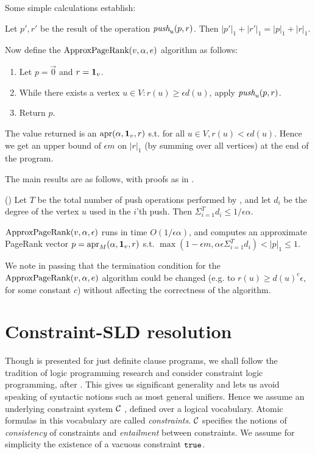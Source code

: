 \documentclass{article} %
\begin{document}
Some simple calculations establish:
\begin{lemma}\label{Lemma:ProbMassConserve}
  Let $p',r'$ be the result of the operation $\mbox{\em push}_u(p,r)$. Then $|p'|_1 + |r'|_1 = |p|_1 + |r|_1$. 
\end{lemma}

Now define the $\mbox{ApproxPageRank}(v,\alpha,e)$ algorithm as follows:
\begin{enumerate}
\item Let $p=\vec{0}$ and $r={\bf 1}_v$.
\item While there exists a vertex $u\in V: r(u) \geq \epsilon d(u)$, apply $\mbox{\em push}_u(p,r)$.
\item Return $p$.
\end{enumerate}
The value returned is an $\mbox{apr}(\alpha,{\bf 1}_v, r)$ s.t. for all $u \in V, r(u)< \epsilon d(u)$. Hence we get an upper bound of $\epsilon m$ on $|r|_1$ (by summing over all vertices) at the end of the program.

The main results are as follows, with proofs as in \cite[Appendix]{Andersen-2006}.

\begin{lemma}(\cite[Lemma 2]{Andersen-2006}) Let $T$ be the total number of push operations performed by \APR, and let $d_i$ be the degree of the vertex $u$ used in the $i$'th push. Then $\Sigma_{i=1}^T d_i \leq 1/\epsilon \alpha$.
\end{lemma}

\begin{theorem}\label{theorem:main}
  $\mbox{ApproxPageRank}(v,\alpha,\epsilon)$ runs in time $O(1/\epsilon \alpha)$, and computes an approximate PageRank vector $p=\mbox{apr}_M(\alpha, {\bf 1}_v,r)$ s.t. $\max(1 - \epsilon m, \alpha \epsilon \Sigma_{i=1}^T d_i) < |p|_1 \leq 1 $.
\end{theorem}

We note in passing that the termination condition for the $\mbox{ApproxPageRank}(v,\alpha,e)$ algorithm could be changed (e.g.{} to $r(u) \geq d(u)^c\epsilon$, for some constant $c$) without affecting the correctness of the algorithm. 



\section{Constraint-SLD resolution}\label{sec:SLD}
Though \cite{Cohen-2015} is presented for just definite clause programs, we shall follow the tradition of logic programming research and consider constraint logic programming, after \cite{Jaffar-1987}. This gives us significant generality and lets us avoid speaking of syntactic notions such as most general unifiers. Hence we assume an underlying constraint system $\cal C$ \cite{Saraswat-1992}, defined over a logical vocabulary. Atomic formulas in this vocabulary are called {\em constraints}. $\cal C$ specifies the notions of {\em consistency} of constraints and {\em entailment} between constraints. We assume for simplicity the existence of a vacuous constraint $\mbox{\tt true}$. 
\end{document}
